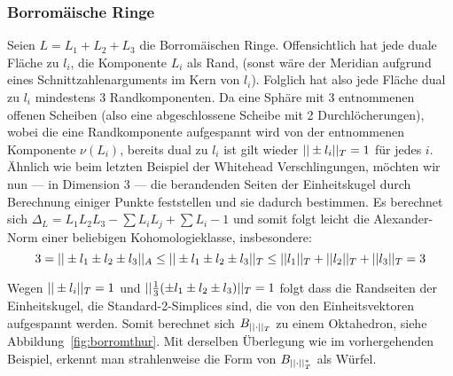     \subsubsection*{Borromäische Ringe}

    Seien $L=L_1 + L_2 + L_3$ die Borromäischen Ringe. Offensichtlich hat jede duale Fläche zu $l_i$, die Komponente $L_i$ als Rand, (sonst wäre der Meridian aufgrund eines Schnittzahlenarguments im Kern von $l_i$). Folglich hat also jede Fläche dual zu $l_i$ mindestens 3 Randkomponenten. Da eine Sphäre mit 3 entnommenen offenen Scheiben (also eine abgeschlossene Scheibe mit 2 Durchlöcherungen), wobei die eine Randkomponente aufgespannt wird von der entnommenen Komponente $\nu(L_i)$, bereits dual zu $l_i$ ist gilt wieder $||\pm l_i||_T=1$ für jedes $i$. Ähnlich wie beim letzten Beispiel der Whitehead Verschlingungen, möchten wir nun --- in Dimension 3 --- die berandenden Seiten der Einheitskugel durch Berechnung einiger Punkte feststellen und sie dadurch bestimmen. Es berechnet sich $\Delta_L = L_1L_2L_3 -\sum L_iL_j + \sum L_i -1$ und somit folgt leicht die Alexander-Norm einer beliebigen Kohomologieklasse, insbesondere:
    \[
        3= ||\pm l_1 \pm l_2 \pm l_3||_A \leq ||\pm l_1 \pm l_2 \pm l_3||_T \leq  ||l_1||_T + ||l_2||_T + ||l_3||_T=3
    \]

    Wegen $||\pm l_i||_T = 1$  und $||\frac13(\pm l_1 \pm l_2 \pm l_3)||_T=1$ folgt dass die Randseiten der Einheitskugel, die Standard-2-Simplices sind, die von den Einheitsvektoren aufgespannt werden. Somit berechnet sich $B_{||\cdot||_T}$ zu einem Oktahedron, siehe Abbildung~\ref{fig:borromthur}. Mit derselben Überlegung wie im vorhergehenden Beispiel, erkennt man strahlenweise die Form von $B_{||\cdot||_T^*}$ als Würfel.

